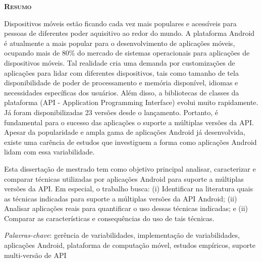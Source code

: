 \begin{center}
	{\Large{\textbf{\mscThesisTitle}}}
\end{center}

\vspace{1cm}


\vspace{1cm}

\begin{center}
	\Large{\textsc{\textbf{Resumo}}}
\end{center}

\noindent Dispositivos móveis estão ficando cada vez mais populares e acessíveis para pessoas
de diferentes poder aquisitivo ao redor do mundo. A plataforma Android é atualmente
a mais popular para o desenvolvimento de aplicações móveis, ocupando mais de 80\%
do mercado de sistemas operacionais para aplicações de dispositivos móveis. Tal
realidade cria uma demanda por customizações de aplicações para lidar com diferentes
dispositivos, tais como tamanho de tela disponibilidade de poder de processamento
e memória disponível, idiomas e necessidades específicas dos usuários. Além disso,
a bibliotecas de classes da plataforma (API - Application Programming Interface)
evolui muito rapidamente. Já foram disponibilizadas 23 versões desde o lançamento. 
Portanto, é fundamental para o sucesso das aplicações o suporte a múltiplas versões
da API. Apesar da popularidade e ampla gama de aplicações Android já desenvolvida,
existe uma carência de estudos que investiguem a forma como aplicações Android lidam
com essa variabilidade.

\noindent Esta dissertação de mestrado tem como objetivo principal analisar, caracterizar e
comparar técnicas utilizadas por aplicações Android para suporte a múltiplas versões
da API. Em especial, o trabalho busca:
(i) Identificar na literatura quais as técnicas indicadas para suporte a múltiplas versões da API Android;
(ii) Analisar aplicações reais para quantificar o uso dessas técnicas indicadas; e
(ii) Comparar as características e consequências do uso de tais técnicas.

\noindent\textit{Palavras-chave}: gerência de variabilidades, implementação de variabilidades, aplicações
Android, plataforma de computação móvel, estudos empíricos, suporte multi-versão de API
